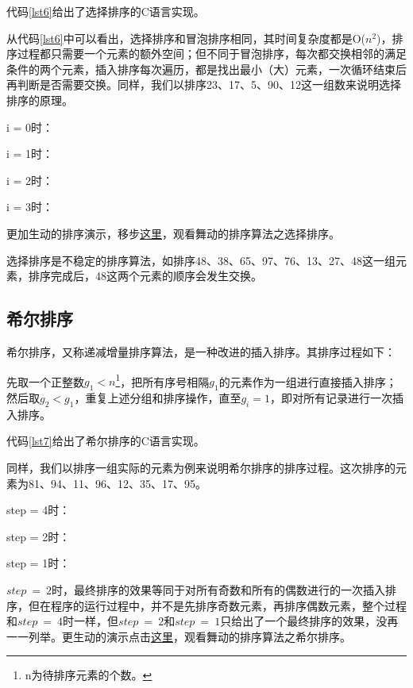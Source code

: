 \documentclass[a4paper, 12pt, titlepage]{article}
\begin{document}
代码\ref{lst6}给出了选择排序的C语言实现。
\begin{spacing}{1.0}
  
\end{spacing}

从代码\ref{lst6}中可以看出，选择排序和冒泡排序相同，其时间复杂度都是O($n^2$)，排序过程都只需要一个元素的额外空间；但不同于冒泡排序，每次都交换相邻的满足条件的两个元素，插入排序每次遍历，都是找出最小（大）元素，一次循环结束后再判断是否需要交换。同样，我们以排序23、17、5、90、12这一组数来说明选择排序的原理。

i = 0时：


i = 1时：


i = 2时：


i = 3时：


更加生动的排序演示，移步\href{http://v.youku.com/v_show/id_XMjU4NTY5NTcy.html?from=y1.2-1-95.3.3-1.1-1-1-2}{这里}，观看舞动的排序算法之选择排序。

选择排序是不稳定的排序算法，如排序48、38、65、97、76、13、27、48这一组元素，排序完成后，48这两个元素的顺序会发生交换。

\subsection{希尔排序}
希尔排序，又称递减增量排序算法，是一种改进的插入排序。其排序过程如下：

先取一个正整数$g_1 < n$\footnote{n为待排序元素的个数。}，把所有序号相隔$g_1$的元素作为一组进行直接插入排序；然后取$g_2 < g_1$，重复上述分组和排序操作，直至$g_i = 1$，即对所有记录进行一次插入排序。

代码\ref{lst7}给出了希尔排序的C语言实现。
\begin{spacing}{1.0}
  
\end{spacing}

同样，我们以排序一组实际的元素为例来说明希尔排序的排序过程。这次排序的元素为81、94、11、96、12、35、17、95。

step = 4时：


step = 2时：


step = 1时：


$step\ =\ 2$时，最终排序的效果等同于对所有奇数和所有的偶数进行的一次插入排序，但在程序的运行过程中，并不是先排序奇数元素，再排序偶数元素，整个过程和$step\ =\ 4$时一样，但$step\ =\ 2$和$step\ =\ 1$只给出了一个最终排序的效果，没再一一列举。更生动的演示点击\href{http://v.youku.com/v_show/id_XMjU4NTcwMDIw.html}{这里}，观看舞动的排序算法之希尔排序。
\end{document}
